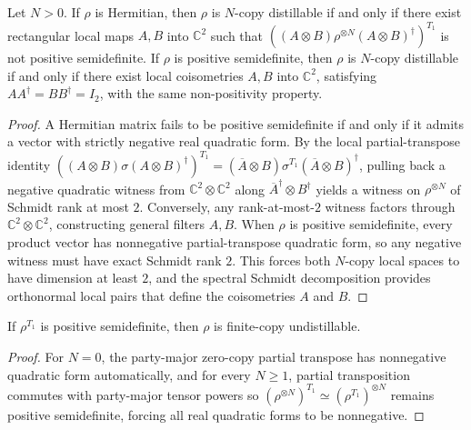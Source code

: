 \begin{theorem}
  \label{thm:finite_copy_filter_criterion}
  \leanok
  Let $N > 0$. If $\rho$ is Hermitian, then $\rho$ is $N$-copy distillable if and only if there exist rectangular local maps $A, B$ into $\mathbb{C}^2$ such that $((A \otimes B)\rho^{\otimes N}(A \otimes B)^\dagger)^{T_1}$ is not positive semidefinite. If $\rho$ is positive semidefinite, then $\rho$ is $N$-copy distillable if and only if there exist local coisometries $A, B$ into $\mathbb{C}^2$, satisfying $A A^\dagger = B B^\dagger = I_2$, with the same non-positivity property.
\end{theorem}
\begin{proof}
  \leanok
  A Hermitian matrix fails to be positive semidefinite if and only if it admits a vector with strictly negative real quadratic form. By the local partial-transpose identity $((A \otimes B)\sigma(A \otimes B)^\dagger)^{T_1} = (\overline{A} \otimes B)\sigma^{T_1}(\overline{A} \otimes B)^\dagger$, pulling back a negative quadratic witness from $\mathbb{C}^2 \otimes \mathbb{C}^2$ along $\overline{A}^\dagger \otimes B^\dagger$ yields a witness on $\rho^{\otimes N}$ of Schmidt rank at most $2$. Conversely, any rank-at-most-$2$ witness factors through $\mathbb{C}^2 \otimes \mathbb{C}^2$, constructing general filters $A, B$. When $\rho$ is positive semidefinite, every product vector has nonnegative partial-transpose quadratic form, so any negative witness must have exact Schmidt rank $2$. This forces both $N$-copy local spaces to have dimension at least $2$, and the spectral Schmidt decomposition provides orthonormal local pairs that define the coisometries $A$ and $B$.
\end{proof}

\begin{theorem}
  \label{thm:finite_copy_ppt}
  \leanok
  If $\rho^{T_1}$ is positive semidefinite, then $\rho$ is finite-copy undistillable.
\end{theorem}
\begin{proof}
  \leanok
  For $N = 0$, the party-major zero-copy partial transpose has nonnegative quadratic form automatically, and for every $N \ge 1$, partial transposition commutes with party-major tensor powers so $(\rho^{\otimes N})^{T_1} \simeq (\rho^{T_1})^{\otimes N}$ remains positive semidefinite, forcing all real quadratic forms to be nonnegative.
\end{proof}

